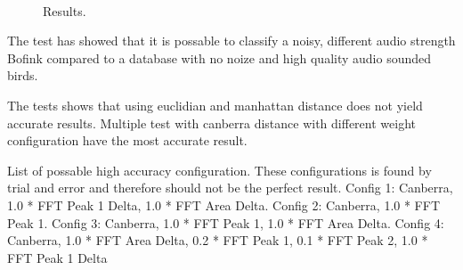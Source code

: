 \begin{figure}[htp]
    ~

    \caption{Results.}
    \label{fig:results}
\end{figure}

The test has showed that it is possable to classify a noisy, different audio strength Bofink compared to a database with no noize and high quality audio sounded birds.

The tests shows that using euclidian and manhattan distance does not yield accurate results.
Multiple test with canberra distance with different weight configuration have the most accurate result.

List of possable high accuracy configuration.
These configurations is found by trial and error and therefore should not be the perfect result.
Config 1: Canberra, 1.0 * FFT Peak 1 Delta, 1.0 * FFT Area Delta.
Config 2: Canberra, 1.0 * FFT Peak 1.
Config 3: Canberra, 1.0 * FFT Peak 1, 1.0 * FFT Area Delta.
Config 4: Canberra, 1.0 * FFT Area Delta, 0.2 * FFT Peak 1, 0.1 * FFT Peak 2, 1.0 * FFT Peak 1 Delta

